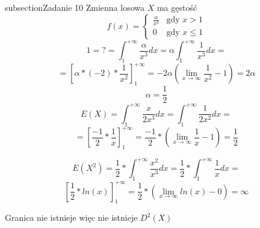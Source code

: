 subsection{Zadanie 10}
Zmienna losowa $X$ ma gęstość 
$$
f(x)
 = \left\{ \begin{array}{ll}
 \frac{\alpha}{x^3} & \textrm{gdy $x > 1$}\\
0 & \textrm{gdy $x \leq 1$}
\end{array} \right.
$$
$$
1 = ? = \int_{1}^{+\infty} \frac{\alpha}{x^3} dx = \alpha \int_{1}^{+\infty} \frac{1}{x^3}dx =
$$
$$
= [\alpha * (-2) *  \frac{1}{x^2} ]_{1}^{+\infty} = -2 \alpha (\lim_{x \to \infty} \frac{1}{x^2} - 1) = 2 \alpha
$$
$$
\alpha = \frac{1}{2}
$$
$$
E(X) = \int_{1}^{+\infty} \frac{x}{2x^3}dx =  \int_{1}^{+\infty} \frac{1}{2x^2}dx =
$$
$$
= [\frac{-1}{2} * \frac{1}{x}]_{1}^{+\infty} = \frac{-1}{2} * (\lim_{x \to \infty} \frac{1}{x} - 1) = \frac{1}{2}
$$
$$
$$

$$
E(X^2) = \frac{1}{2} * \int_{1}^{+\infty} \frac{x^2}{x^3}dx =  \frac{1}{2} * \int_{1}^{+\infty} \frac{1}{x}dx = 
$$
$$
[\frac{1}{2} * ln(x)] _{1}^{+\infty} = \frac{1}{2} * (\lim_{x \to \infty} ln(x) - 0 ) = \infty
$$

Granica nie istnieje więc nie istnieje $D^2(X)$
